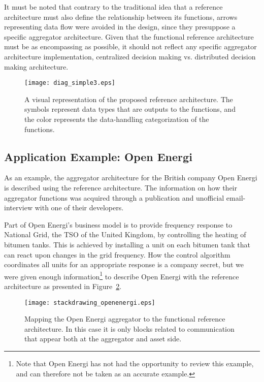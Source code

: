 It must be noted that contrary to the traditional idea that a reference architecture must also define the relationship between its functions, arrows representing data flow were avoided in the design, since they presuppose a specific aggregator architecture. Given that the functional reference architecture must be as encompassing as possible, it should not reflect any specific aggregator architecture implementation, \eg centralized decision making vs. distributed decision making architecture. 
\begin{figure}[htb]
\centering
\texttt{[image: diag\_simple3.eps]}
\caption{A visual representation of the proposed reference architecture. The symbols represent data types that are outputs to the functions, and the color represents the data-handling categorization of the functions.}
\label{fig:MAINrefarch}
\end{figure}

\subsection{Application Example: Open Energi}
As an example, the aggregator architecture for the British company Open Energi is described using the reference architecture. The information on how their aggregator functions was acquired through a publication and unofficial email-interview with one of their developers.

Part of Open Energi's business model is to provide frequency response to National Grid, the TSO of the United Kingdom, by controlling the heating of bitumen tanks. This is achieved by installing a unit on each bitumen tank that can react upon changes in the grid frequency. How the control algorithm coordinates all units for an appropriate response is a company secret, but we were given enough information\footnote{Note that Open Energi has not had the opportunity to review this example, and can therefore not be taken as an accurate example.} to describe Open Energi with the reference architecture as presented in Figure~\ref{fig:openenergirefarch}.

\begin{figure}[htb]
\centering
\texttt{[image: stackdrawing\_openenergi.eps]}
\caption{Mapping the Open Energi aggregator to the functional reference architecture. In this case it is only blocks related to communication that appear both at the aggregator and asset side.}
\label{fig:openenergirefarch}
\end{figure}

